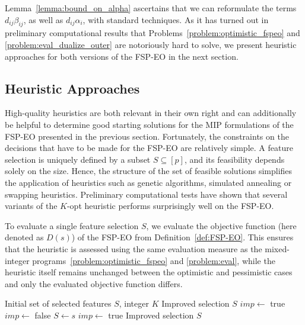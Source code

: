\documentclass[11pt, a4paper]{article}
\newcommand{\fspeo}{FSP-EO\xspace}
\newcommand{\FRil}[1]{\todo[color=black, textcolor=white, inline, author=FR]{#1}}
\newcommand{\AMil}[1]{\todo[color=green!50!black, textcolor=white, inline, author=AM]{#1}}
\newcommand{\instfeatures}{[p]} %
\newcommand{\fsel}{S} %
\begin{document}
Lemma~\ref{lemma:bound_on_alpha} ascertains that we can reformulate the terms $d_{ij}\beta_{ij}$, as well as $d_{ij}\alpha_i$, with standard techniques.
As it has turned out in preliminary computational results that Problems~\eqref{problem:optimistic_fspeo} and \eqref{problem:eval_dualize_outer} are notoriously hard to solve, we present heuristic approaches for both versions of the \fspeo in the next section.


\subsection{Heuristic Approaches}\label{sec:heuristic}


High-quality heuristics are both relevant in their own right and can additionally be helpful to determine good starting solutions for the MIP formulations of the \fspeo presented in the previous section.
Fortunately, the constraints on the decisions that have to be made for the \fspeo are relatively simple.
A feature selection is uniquely defined by a subset $\fsel\subseteq \instfeatures$, and its feasibility depends solely on the size.
Hence, the structure of the set of feasible solutions simplifies the application of heuristics such as genetic algorithms, simulated annealing or swapping heuristics.
Preliminary computational tests have shown that several variants of
the $K$-opt heuristic performs surprisingly well on the \fspeo.

To evaluate a single feature selection $\fsel$, we evaluate the objective function (here denoted as $D(s)$) of the \fspeo from Definition~\ref{def:FSP-EO}. This ensures that the heuristic is assessed using the same evaluation measure as the mixed-integer programs~\eqref{problem:optimistic_fspeo} and \eqref{problem:eval}, while the heuristic itself remains unchanged between the optimistic and pessimistic cases and only the evaluated objective function differs.
\begin{algorithm}
	\caption{$K$-opt heuristic for the \fspeo}
	\begin{algorithmic}[1]
		\Require Initial set of selected features $\fsel$, integer $K$
		\Ensure Improved selection $\fsel$
		\State $imp \gets$ true
		\State $imp \gets$ false
		\ForAll{$s \in \{s' \subseteq \instfeatures \colon |s' \triangle \fsel| \leq 2K, |s'| = |\fsel|\}$}	\label{alg:iter}
		\If{$D(s) < D(\fsel)$}
		\State $\fsel \gets s$
		\State $imp \gets$ true
		\EndIf
		\EndFor
		\EndWhile
		\State \Return Improved selection $\fsel$
	\end{algorithmic}
	\label{alg:k-opt}
\end{algorithm}
\end{document}
